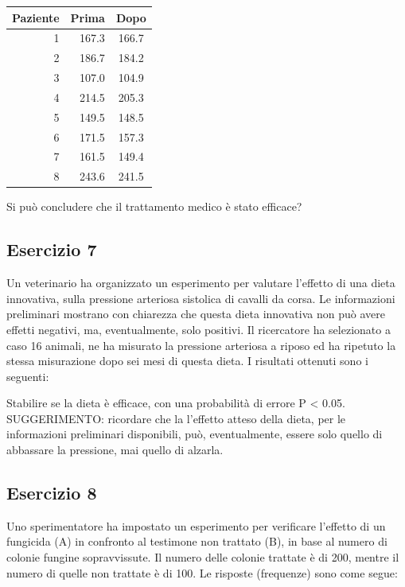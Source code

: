 \documentclass[a4paper,12pt,oneside]{book}
\begin{document}
\begin{longtable}[]{@{}rrc@{}}
\toprule()
Paziente & Prima & Dopo \\
\midrule()
\endhead
1 & 167.3 & 166.7 \\
2 & 186.7 & 184.2 \\
3 & 107.0 & 104.9 \\
4 & 214.5 & 205.3 \\
5 & 149.5 & 148.5 \\
6 & 171.5 & 157.3 \\
7 & 161.5 & 149.4 \\
8 & 243.6 & 241.5 \\
\bottomrule()
\end{longtable}

Si può concludere che il trattamento medico è stato efficace?

\hypertarget{esercizio-7-1}{%
\subsection{Esercizio 7}\label{esercizio-7-1}}

Un veterinario ha organizzato un esperimento per valutare l'effetto di una dieta innovativa, sulla pressione arteriosa sistolica di cavalli da corsa. Le informazioni preliminari mostrano con chiarezza che questa dieta innovativa non può avere effetti negativi, ma, eventualmente, solo positivi. Il ricercatore ha selezionato a caso 16 animali, ne ha misurato la pressione arteriosa a riposo ed ha ripetuto la stessa misurazione dopo sei mesi di questa dieta. I risultati ottenuti sono i seguenti:

Stabilire se la dieta è efficace, con una probabilità di errore P \textless{} 0.05. SUGGERIMENTO: ricordare che la l'effetto atteso della dieta, per le informazioni preliminari disponibili, può, eventualmente, essere solo quello di abbassare la pressione, mai quello di alzarla.

\hypertarget{esercizio-8-1}{%
\subsection{Esercizio 8}\label{esercizio-8-1}}

Uno sperimentatore ha impostato un esperimento per verificare l'effetto di un fungicida (A) in confronto al testimone non trattato (B), in base al numero di colonie fungine sopravvissute. Il numero delle colonie trattate è di 200, mentre il numero di quelle non trattate è di 100. Le risposte (frequenze) sono come segue:
\end{document}
